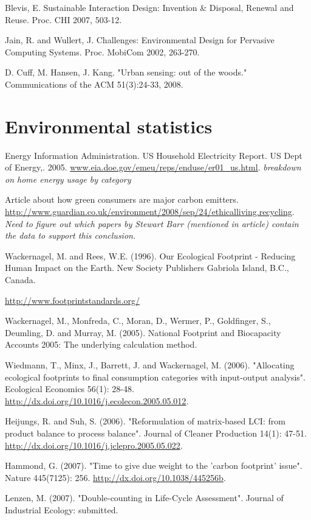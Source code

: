 Blevis, E.  Sustainable Interaction Design: Invention \& Disposal, Renewal and Reuse.  Proc. CHI 2007, 503-12.

Jain, R. and Wullert, J. Challenges: Environmental Design for Pervasive Computing Systems.  Proc. MobiCom 2002, 263-270.

D. Cuff, M. Hansen, J. Kang. "Urban sensing: out of the woods." Communications of the ACM 51(3):24-33, 2008.




\section{Environmental statistics}
Energy Information Administration. US Household Electricity Report. US Dept of Energy,. 2005. \url{www.eia.doe.gov/emeu/reps/enduse/er01_us.html}. \emph{breakdown on home energy usage by category}

Article about how green consumers are major carbon emitters. \url{http://www.guardian.co.uk/environment/2008/sep/24/ethicalliving.recycling}. \emph{Need to figure out which papers by Stewart Barr (mentioned in article) contain the data to support this conclusion.}

Wackernagel, M. and Rees, W.E. (1996). Our Ecological Footprint - Reducing Human Impact on the Earth. New Society Publishers Gabriola Island, B.C., Canada.

\url{http://www.footprintstandards.org/}

Wackernagel, M., Monfreda, C., Moran, D., Wermer, P., Goldfinger, S., Deumling, D. and Murray, M. (2005). National Footprint and Biocapacity Accounts 2005: The underlying calculation method.

Wiedmann, T., Minx, J., Barrett, J. and Wackernagel, M. (2006). "Allocating ecological footprints to final consumption categories with input-output analysis". Ecological Economics 56(1): 28-48. \url{http://dx.doi.org/10.1016/j.ecolecon.2005.05.012}.

Heijungs, R. and Suh, S. (2006). "Reformulation of matrix-based LCI: from product balance to process balance". Journal of Cleaner Production 14(1): 47-51. 
\url{http://dx.doi.org/10.1016/j.jclepro.2005.05.022}.

Hammond, G. (2007). "Time to give due weight to the 'carbon footprint' issue". Nature 445(7125): 256. \url{http://dx.doi.org/10.1038/445256b}.

Lenzen, M. (2007). "Double-counting in Life-Cycle Assessment". Journal of Industrial Ecology: submitted.

